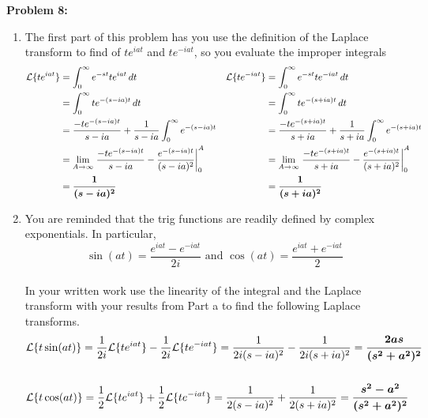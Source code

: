 \documentclass[12pt]{article}
\begin{document}
\noindent \textbf{Problem 8: }
	\begin{enumerate}[label = (\alph*)]
		\item The first part of this problem has you use the definition of the Laplace transform to find of $te^{iat}$ and $te^{-iat}$, so you evaluate the improper integrals
		\begin{align*}
			\mathcal{L}\{te^{iat}\} &= \int_0^{\infty} e^{-st}te^{iat}\,dt & \mathcal{L}\{te^{-iat}\} &= \int_0^{\infty} e^{-st}te^{-iat}\,dt \\
			&= \int_0^{\infty} te^{-(s-ia)t}\,dt & &= \int_0^{\infty} te^{-(s+ia)t}\,dt \\
			&= \frac{-te^{-(s-ia)t}}{s-ia} + \frac{1}{s-ia}\int_0^\infty e^{-(s-ia)t} & &= \frac{-te^{-(s+ia)t}}{s+ia} + \frac{1}{s+ia}\int_0^\infty e^{-(s+ia)t}  \\
			&= \lim\limits_{A \rightarrow \infty} \left. \frac{-te^{-(s-ia)t}}{s-ia} - \frac{e^{-(s-ia)t}}{(s-ia)^2} \right|^{A}_0 & &= \lim\limits_{A \rightarrow \infty} \left. \frac{-te^{-(s+ia)t}}{s+ia} - \frac{e^{-(s+ia)t}}{(s+ia)^2} \right|^{A}_0 \\
			&=\text{\boldmath $\frac{1}{(s-ia)^2}$} & 	&= \text{\boldmath $\frac{1}{(s+ia)^2}$}
		\end{align*}
		\item You are reminded that the trig functions are readily defined by complex exponentials. In particular,
			$$
			\sin(at) = \frac{e^{iat} - e^{-iat}}{2i} \text{ and } \cos(at) = \frac{e^{iat} + e^{-iat}}{2}
			$$
		\\In your written work use the linearity of the integral and the Laplace transform with your results from Part a to find the following Laplace transforms.
			\begin{align*}
				&\mathcal{L}\{t\sin(at)\} = \frac{1}{2i}\mathcal{L}\{te^{iat}\} - \frac{1}{2i}\mathcal{L}\{te^{-iat}\} = \frac{1}{2i(s-ia)^2} - \frac{1}{2i(s+ia)^2} = \text{\boldmath $\frac{2as}{(s^2 + a^2)^2}$}\\  \\
				&\mathcal{L}\{t\cos(at)\} = \frac{1}{2}\mathcal{L}\{te^{iat}\} + \frac{1}{2}\mathcal{L}\{te^{-iat}\} = \frac{1}{2(s-ia)^2} + \frac{1}{2(s+ia)^2} = \text{\boldmath $\frac{s^2 - a^2}{(s^2 + a^2)^2}$}
			\end{align*}
			
		\newpage
		

\end{enumerate}
\end{document}
